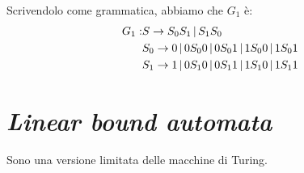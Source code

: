 Scrivendolo come grammatica, abbiamo che $G_1$ \`e:
\begin{align*}
G_1 :& S \to S_0 S_1 \, | \, S_1 S_0 \\
& S_0 \to 0 \, | \, 0 S_0 0 \, | \, 0 S_0 1 \, | \, 1 S_0 0 \, | \, 1 S_0 1 \\
& S_1 \to 1 \, | \, 0 S_1 0 \, | \, 0 S_1 1 \, | \, 1 S_1 0 \, | \, 1 S_1 1 
\end{align*}

\section{\emph{Linear bound automata}}

Sono una versione limitata delle macchine di Turing.

